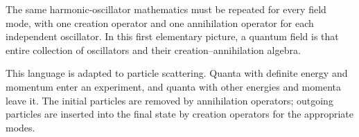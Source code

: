 The same harmonic-oscillator mathematics must be repeated for every field mode, with one creation operator and one annihilation operator for each independent oscillator. In this first elementary picture, a quantum field is that entire collection of oscillators and their creation--annihilation algebra.

This language is adapted to particle scattering. Quanta with definite energy and momentum enter an experiment, and quanta with other energies and momenta leave it. The initial particles are removed by annihilation operators; outgoing particles are inserted into the final state by creation operators for the appropriate modes.

\begin{classroomqa}
\end{classroomqa}
